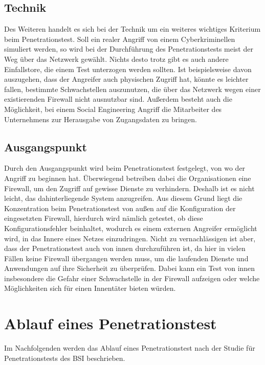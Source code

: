 \subsection{Technik}
Des Weiteren handelt es sich bei der Technik um ein weiteres wichtiges Kriterium beim Penetrationstest. Soll ein realer Angriff von einem Cyberkriminellen simuliert werden, so wird bei der Durchführung des Penetrationstests meist der Weg über das Netzwerk gewählt. Nichts desto trotz gibt es auch andere Einfallstore, die einem Test unterzogen werden sollten. Ist beispielsweise davon auszugehen, dass der Angreifer auch physischen Zugriff hat, könnte es leichter fallen, bestimmte Schwachstellen auszunutzen, die über das Netzwerk wegen einer existierenden Firewall nicht ausnutzbar sind. Außerdem besteht auch die Möglichkeit, bei einem Social Engineering Angriff  die Mitarbeiter des Unternehmens zur Herausgabe von Zugangsdaten zu bringen.

\subsection{Ausgangspunkt}
Durch den Ausgangspunkt wird beim Penetrationstest festgelegt, von wo der Angriff zu beginnen hat. Überwiegend betreiben dabei die Organisationen eine Firewall, um den Zugriff auf gewisse Dienste zu verhindern. Deshalb ist es nicht leicht, das dahinterliegende System anzugreifen. Aus diesem Grund liegt die Konzentration beim Penetrationstest von außen auf die Konfiguration der eingesetzten Firewall, hierdurch wird nämlich getestet, ob diese Konfigurationsfehler beinhaltet, wodurch es einem externen Angreifer ermöglicht wird, in das Innere eines Netzes einzudringen. Nicht zu vernachlässigen ist aber, dass der Penetrationstest auch von innen durchzuführen ist, da hier in vielen Fällen keine Firewall übergangen werden muss, um die laufenden Dienste und Anwendungen auf ihre Sicherheit zu überprüfen. Dabei kann ein Test von innen insbesondere die Gefahr einer Schwachstelle in der Firewall aufzeigen oder welche Möglichkeiten sich für einen Innentäter bieten würden.

\section{Ablauf eines Penetrationstest}
\label{ablaufpentest}
Im Nachfolgenden werden das Ablauf eines Penetrationstest nach der Studie für Penetrationstests des BSI\cite[100--106]{pt03bsi} beschrieben.

\newpage

